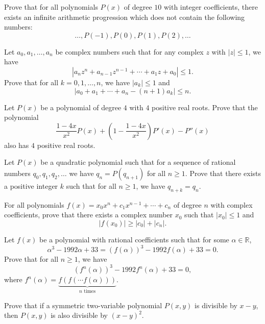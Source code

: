 \begin{question}[name={1996 Russia}]
    Prove that for all polynomials $P(x)$ of degree $10$ with integer coefficients, there exists an infinite arithmetic progression which does not contain the following numbers:
    \[\dots, P(-1), P(0), P(1), P(2), \dots\]
\end{question}


\begin{question}[name={1997 Romania}]
    Let $a_0,a_1,\dots,a_n$ be complex numbers such that for any complex $z$ with $|z|\leq 1$, we have \[|a_nz^n + a_{n-1}z^{n-1} + \cdots + a_1z + a_0| \leq 1.\] Prove that for all $k=0,1,\dots,n$, we have $|a_k| \leq 1$ and \[|a_0+a_1+\cdots+a_n-(n+1)a_k| \leq n.\]
\end{question}


\begin{question}[name={1994 Vietnam}]
    Let $P(x)$ be a polynomial of degree $4$ with $4$ positive real roots. Prove that the polynomial
    \[\frac{1-4x}{x^2}P(x) + \left(1 - \frac{1-4x}{x^2}\right)P'(x) - P''(x)\]
    also has $4$ positive real roots.
\end{question}


\begin{question}
    Let $P(x)$ be a quadratic polynomial such that for a sequence of rational numbers $q_0,q_1,q_2,\dots$ we have $q_n = P(q_{n+1})$ for all $n \geq 1$. Prove that there exists a positive integer $k$ such that for all $n\geq 1$, we have $q_{n+k}=q_n$.
\end{question}


\begin{question}[name={1994 China}]
    For all polynomials $f(x)=x_0x^n + c_1x^{n-1} + \cdots + c_n$ of degree $n$ with complex coefficients, prove that there exists a complex number $x_0$ such that $|x_0| \leq 1$ and \[|f(x_0)| \geq |c_0| + |c_n|.\]
\end{question}


\begin{question}
    Let $f(x)$ be a polynomial with rational coefficients such that for some $\alpha \in \mathbb R$,
    \[\alpha^3 - 1992 \alpha + 33 = (f(\alpha))^3 - 1992 f(\alpha) + 33 = 0.\]
    Prove that for all $n\geq 1$, we have
    \[(f^n(\alpha))^3 - 1992 f^n(\alpha) + 33=0,\]
    where $f^n(\alpha) = \underbrace{f(f(\cdots f(\alpha)))}_{n \text{ times}}$.
\end{question}


\begin{question}
    Prove that if a symmetric two-variable polynomial $P(x,y)$ is divisible by $x-y$, then $P(x,y)$ is also divisible by $(x-y)^2$.
\end{question}

